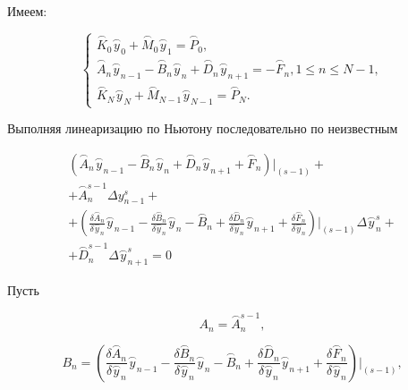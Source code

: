 \documentclass[a4paper,14pt]{article}
\begin{document}
Имеем:

\begin{equation}
	\begin{cases}
		\stackrel{\frown}{K}_0 \stackrel{\frown}{y}_0 + \stackrel{\frown}{M}_0 \stackrel{\frown}{y}_1 = \stackrel{\frown}{P}_0, \\
		\stackrel{\frown}{A}_n \stackrel{\frown}{y}_{n-1} - \stackrel{\frown}{B}_n \stackrel{\frown}{y}_n + \stackrel{\frown}{D}_n \stackrel{\frown}{y}_{n+1} = - \stackrel{\frown}{F}_n, 1 \leq n \leq N-1, \\
		\stackrel{\frown}{K}_N \stackrel{\frown}{y}_N + \stackrel{\frown}{M}_{N-1} \stackrel{\frown}{y}_{N-1} = \stackrel{\frown}{P}_N.
	\end{cases}
\end{equation}

Выполняя линеаризацию по Ньютону последовательно по неизвестным 

\begin{eqnarray}
	\left( \stackrel{\frown}{A}_n \stackrel{\frown}{y}_{n-1} - \stackrel{\frown}{B}_n \stackrel{\frown}{y}_n + \stackrel{\frown}{D}_n \stackrel{\frown}{y}_{n+1} + \stackrel{\frown}{F}_n \right) \bigg|_{(s-1)} + \nonumber \\
	+ \stackrel{\frown}{A}_n^{s-1} \Delta y_{n-1}^s + \nonumber \\
	+ \left( \frac{\delta \stackrel{\frown}{A}_n}{\delta \stackrel{\frown}{y}_n} \stackrel{\frown}{y}_{n-1} - \frac{ \delta \stackrel{\frown}{B}_n}{\delta \stackrel{\frown}{y}_n} \stackrel{\frown}{y}_n - \stackrel{\frown}{B}_n + \frac{\delta \stackrel{\frown}{D}_n}{\delta \stackrel{\frown}{y}_n} \stackrel{\frown}{y}_{n+1} + \frac{\delta \stackrel{\frown}{F}_n}{\delta \stackrel{\frown}{y}_n} \right) \bigg|_{(s-1)} \Delta \stackrel{\frown}{y}_n^s + \nonumber \\
	+ \stackrel{\frown}{D}_n^{s-1} \Delta \stackrel{\frown}{y}_{n+1}^s = 0
\end{eqnarray}

Пусть 

\begin{equation}
	A_n = \stackrel{\frown}{A}_n^{s-1},
\end{equation}

\begin{equation}
	B_n = \left( \frac{\delta \stackrel{\frown}{A}_n}{\delta \stackrel{\frown}{y}_n} \stackrel{\frown}{y}_{n-1} - \frac{ \delta \stackrel{\frown}{B}_n}{\delta \stackrel{\frown}{y}_n} \stackrel{\frown}{y}_n - \stackrel{\frown}{B}_n + \frac{\delta \stackrel{\frown}{D}_n}{\delta \stackrel{\frown}{y}_n} \stackrel{\frown}{y}_{n+1} + \frac{\delta \stackrel{\frown}{F}_n}{\delta \stackrel{\frown}{y}_n} \right) \bigg|_{(s-1)},
\end{equation}
\end{document}
